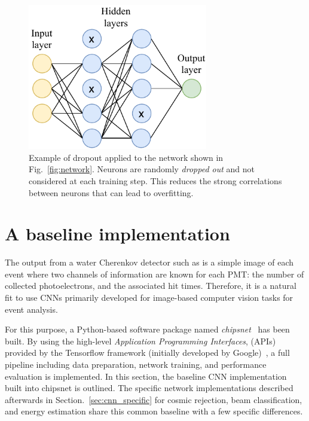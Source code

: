 \begin{figure} %
    \includegraphics[width=0.7\textwidth]{diagrams/6-cnn/dropout.pdf}
    \caption[Illustration of dropout]
    {Example of dropout applied to the network shown in Fig.~\ref{fig:network}. Neurons are
        randomly \emph{dropped out} and not considered at each training step. This reduces the
        strong correlations between neurons that can lead to overfitting.}
    \label{fig:dropout}
\end{figure}

\section{A baseline implementation} %
\label{sec:cnn_baseline} %

The output from a water Cherenkov detector such as \chips is a simple image of each event where
two channels of information are known for each PMT: the number of collected photoelectrons, and
the associated hit times. Therefore, it is a natural fit to use CNNs primarily developed for
image-based computer vision tasks for \chips event analysis.

For this purpose, a Python-based software package named \emph{chipsnet}~\cite{chipsnet2020} has
been built. By using the high-level \emph{Application Programming Interfaces}, (APIs) provided by
the Tensorflow framework (initially developed by Google)~\cite{tf2015}, a full pipeline including
data preparation, network training, and performance evaluation is implemented. In this section,
the baseline CNN implementation built into chipsnet is outlined. The specific network
implementations described afterwards in Section.~\ref{sec:cnn_specific} for cosmic rejection, beam
classification, and energy estimation share this common baseline with a few specific differences.

